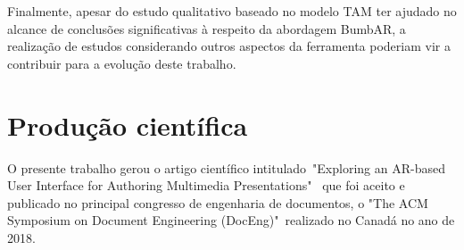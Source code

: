 \documentclass[../main.tex]{subfiles}
\begin{document}
Finalmente, apesar do estudo qualitativo baseado no modelo TAM ter ajudado no alcance de conclusões significativas à respeito da abordagem BumbAR, a realização de estudos considerando outros aspectos da ferramenta poderiam vir a contribuir para a evolução deste trabalho.

\section{Produção científica}

O presente trabalho gerou o artigo científico intitulado~"Exploring an AR-based User Interface for Authoring Multimedia Presentations"~\cite{mendes2018exploring} que foi aceito e publicado no principal congresso de engenharia de documentos, o "The ACM Symposium on Document Engineering (DocEng)"~realizado no Canadá no ano de 2018. 
\end{document}
